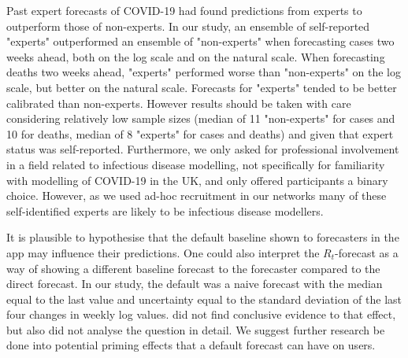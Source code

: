 \documentclass[10pt,a4paper,twocolumn]{article}
\begin{document}

Past expert forecasts of COVID-19 \cite{recchiaHowWellDid2021} had found predictions from experts to outperform those of non-experts. In our study, an ensemble of self-reported "experts" outperformed an ensemble of "non-experts" when forecasting cases two weeks ahead, both on the log scale and on the natural scale. When forecasting deaths two weeks ahead, "experts" performed worse than "non-experts" on the log scale, but better on the natural scale. Forecasts for "experts" tended to be better calibrated than non-experts.  However results should be taken with care considering relatively low sample sizes (median of 11 "non-experts" for cases and 10 for deaths, median of 8 "experts" for cases and deaths) and given that expert status was self-reported. Furthermore, we only asked for professional involvement in a field related to infectious disease modelling, not specifically for familiarity with modelling of COVID-19 in the UK, and only offered participants a binary choice. However, as we used ad-hoc recruitment in our networks many of these self-identified experts are likely to be infectious disease modellers.

It is plausible to hypothesise that the default baseline shown to forecasters in the app may influence their predictions. One could also interpret the $R_t$-forecast as a way of showing a different baseline forecast to the forecaster compared to the direct forecast. In our study, the default was a naive forecast with the median equal to the last value and uncertainty equal to the standard deviation of the last four changes in weekly log values. \cite{bosseComparingHumanModelbased2022} did not find conclusive evidence to that effect, but also did not analyse the question in detail. We suggest further research be done into potential priming effects that a default forecast can have on users. 
\end{document}
